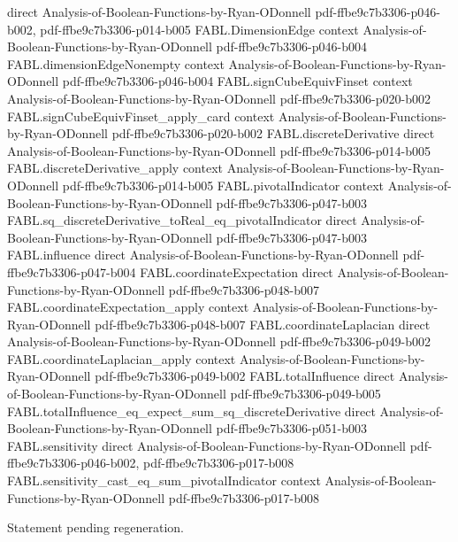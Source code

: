 \begin{theorem}
  {direct}
  {Analysis-of-Boolean-Functions-by-Ryan-ODonnell}
  {pdf-ffbe9c7b3306-p046-b002,
    pdf-ffbe9c7b3306-p014-b005}
\proofstep
  {FABL.DimensionEdge}
  {context}
  {Analysis-of-Boolean-Functions-by-Ryan-ODonnell}
  {pdf-ffbe9c7b3306-p046-b004}
\proofstep
  {FABL.dimensionEdgeNonempty}
  {context}
  {Analysis-of-Boolean-Functions-by-Ryan-ODonnell}
  {pdf-ffbe9c7b3306-p046-b004}
\proofstep
  {FABL.signCubeEquivFinset}
  {context}
  {Analysis-of-Boolean-Functions-by-Ryan-ODonnell}
  {pdf-ffbe9c7b3306-p020-b002}
\proofstep
  {FABL.signCubeEquivFinset_apply_card}
  {context}
  {Analysis-of-Boolean-Functions-by-Ryan-ODonnell}
  {pdf-ffbe9c7b3306-p020-b002}
\proofstep
  {FABL.discreteDerivative}
  {direct}
  {Analysis-of-Boolean-Functions-by-Ryan-ODonnell}
  {pdf-ffbe9c7b3306-p014-b005}
\proofstep
  {FABL.discreteDerivative_apply}
  {context}
  {Analysis-of-Boolean-Functions-by-Ryan-ODonnell}
  {pdf-ffbe9c7b3306-p014-b005}
\proofstep
  {FABL.pivotalIndicator}
  {context}
  {Analysis-of-Boolean-Functions-by-Ryan-ODonnell}
  {pdf-ffbe9c7b3306-p047-b003}
\proofstep
  {FABL.sq_discreteDerivative_toReal_eq_pivotalIndicator}
  {direct}
  {Analysis-of-Boolean-Functions-by-Ryan-ODonnell}
  {pdf-ffbe9c7b3306-p047-b003}
\proofstep
  {FABL.influence}
  {direct}
  {Analysis-of-Boolean-Functions-by-Ryan-ODonnell}
  {pdf-ffbe9c7b3306-p047-b004}
\proofstep
  {FABL.coordinateExpectation}
  {direct}
  {Analysis-of-Boolean-Functions-by-Ryan-ODonnell}
  {pdf-ffbe9c7b3306-p048-b007}
\proofstep
  {FABL.coordinateExpectation_apply}
  {context}
  {Analysis-of-Boolean-Functions-by-Ryan-ODonnell}
  {pdf-ffbe9c7b3306-p048-b007}
\proofstep
  {FABL.coordinateLaplacian}
  {direct}
  {Analysis-of-Boolean-Functions-by-Ryan-ODonnell}
  {pdf-ffbe9c7b3306-p049-b002}
\proofstep
  {FABL.coordinateLaplacian_apply}
  {context}
  {Analysis-of-Boolean-Functions-by-Ryan-ODonnell}
  {pdf-ffbe9c7b3306-p049-b002}
\proofstep
  {FABL.totalInfluence}
  {direct}
  {Analysis-of-Boolean-Functions-by-Ryan-ODonnell}
  {pdf-ffbe9c7b3306-p049-b005}
\proofstep
  {FABL.totalInfluence_eq_expect_sum_sq_discreteDerivative}
  {direct}
  {Analysis-of-Boolean-Functions-by-Ryan-ODonnell}
  {pdf-ffbe9c7b3306-p051-b003}
\proofstep
  {FABL.sensitivity}
  {direct}
  {Analysis-of-Boolean-Functions-by-Ryan-ODonnell}
  {pdf-ffbe9c7b3306-p046-b002,
    pdf-ffbe9c7b3306-p017-b008}
\proofstep
  {FABL.sensitivity_cast_eq_sum_pivotalIndicator}
  {context}
  {Analysis-of-Boolean-Functions-by-Ryan-ODonnell}
  {pdf-ffbe9c7b3306-p017-b008}

Statement pending regeneration.
\end{theorem}

